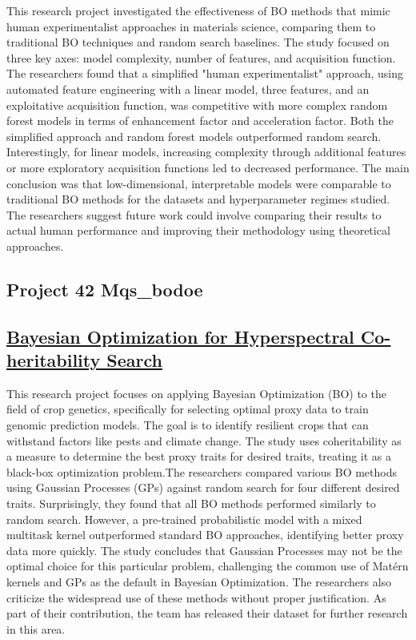 This research project investigated the effectiveness of BO methods that mimic human experimentalist approaches in materials science\cite{muckley2023interpretable}, comparing them to traditional BO techniques and random search baselines\cite{snoek2012practical,bergstra2012random}. The study focused on three key axes: model complexity, number of features, and acquisition function. The researchers found that a simplified "human experimentalist" approach, using automated feature engineering with a linear model, three features, and an exploitative acquisition function, was competitive with more complex random forest models in terms of enhancement factor and acceleration factor. Both the simplified approach and random forest models outperformed random search. Interestingly, for linear models, increasing complexity through additional features or more exploratory acquisition functions led to decreased performance. The main conclusion was that low-dimensional, interpretable models were comparable to traditional BO methods for the datasets and hyperparameter regimes studied. The researchers suggest future work could involve comparing their results to actual human performance and improving their methodology using theoretical approaches.
 \subsection*{Project 42 Mqs_bodoe}


 \subsection*{\href{https://www.youtube.com/watch?v=mY6Empkb8L4}{Bayesian Optimization for Hyperspectral Co-heritability Search}}

This research project focuses on applying Bayesian Optimization (BO) to the field of crop genetics, specifically for selecting optimal proxy data to train genomic prediction models. The goal is to identify resilient crops that can withstand factors like pests and climate change. The study uses coheritability as a measure to determine the best proxy traits for desired traits, treating it as a black-box optimization problem.The researchers compared various BO methods using Gaussian Processes (GPs) against random search for four different desired traits. Surprisingly, they found that all BO methods performed similarly to random search. However, a pre-trained probabilistic model with a mixed multitask kernel outperformed standard BO approaches, identifying better proxy data more quickly. The study concludes that Gaussian Processes may not be the optimal choice for this particular problem, challenging the common use of Matérn kernels and GPs as the default in Bayesian Optimization. The researchers also criticize the widespread use of these methods without proper justification. As part of their contribution, the team has released their dataset for further research in this area.
